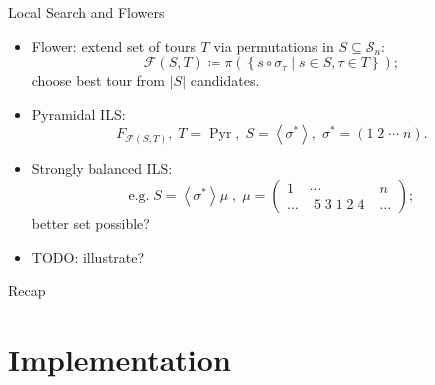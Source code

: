 \documentclass[
  size=8pt,
  style=klope,
  paper=screen,
  pauseslide,
  nopagebreaks,
  hlsections,
  fleqn
]{powerdot}
\def\todo{\color{red}}
\def\eqitspace{\vspace{-5mm}}
\begin{document}
\begin{slide}{Local Search and Flowers}
  \begin{itemize}
  \item
    Flower: extend set of tours $T$ via permutations in $S \subseteq \mathcal{S}_n$:
    \begin{equation}
      \mathcal{F}\left(S,T\right) \coloneqq \pi\left(\left\{ s \circ \sigma_\tau \mid s \in S, \tau \in T\right\}\right);
    \end{equation}
  choose best tour from $\lvert S \rvert$ candidates.
  \item
    Pyramidal ILS:
    \begin{equation}
      F_{\mathcal{F}\left(S,T\right)}, \;
      T = \operatorname{Pyr}, \;
      S = \left<\sigma^\ast\right>, \;
      \sigma^\ast = \left(1\;2\;\cdots\;n\right).
    \end{equation}
  \eqitspace%
  \item
  Strongly balanced ILS:
    \begin{equation}
      \text{e.g.} \; S = \left<\sigma^\ast\right>\mu \;,\;
      \mu =
      \begin{pmatrix}
        1 & \cdots & n \\
        \ldots & \; 5 \; 3 \; 1 \; 2 \; 4 \; & \ldots
      \end{pmatrix};
    \end{equation}
    better set possible?
  \item
  {\todo TODO:} illustrate?
  \end{itemize}
\end{slide}

\begin{slide}[toc=,bm=]{Recap}
\tableofcontents[content=currentsection,type=1]
\end{slide}

\section[template=wideslide]{Implementation}
\end{document}
